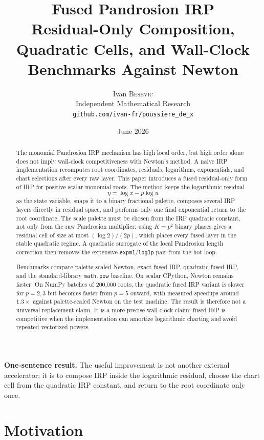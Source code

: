 \documentclass[10pt,a4paper]{article}
\title{\bfseries Fused Pandrosion IRP\\[-0.1em]
\large Residual-Only Composition, Quadratic Cells, and Wall-Clock Benchmarks Against Newton}
\author{Ivan \textsc{Besevic}\\[-0.2em]
\small Independent Mathematical Research\\[-0.2em]
\small \texttt{github.com/ivan-fr/poussiere\_de\_x}}
\date{June 2026}
\theoremstyle{plain}
\theoremstyle{definition}
\newenvironment{takeaway}{%
  \begin{center}\begin{minipage}{0.92\linewidth}\small\itshape\color{blue!45!black}%
}{%
  \end{minipage}\end{center}%
}
\begin{document}
\maketitle

\begin{abstract}
The monomial Pandrosion IRP mechanism has high local order, but high order alone
does not imply wall-clock competitiveness with Newton's method.  A naive IRP
implementation recomputes root coordinates, residuals, logarithms, exponentials,
and chart selections after every raw layer.  This paper introduces a fused
residual-only form of IRP for positive scalar monomial roots.  The method keeps
the logarithmic residual
\[
  \eta=\log x-p\log u
\]
as the state variable, snaps it to a binary fractional palette, composes several
IRP layers directly in residual space, and performs only one final exponential
return to the root coordinate.  The scale palette must be chosen from the IRP
quadratic constant, not only from the raw Pandrosion multiplier: using
$K=p^2$ binary phases gives a residual cell of size at most $(\log 2)/(2p)$,
which places every fused layer in the stable quadratic regime.  A quadratic
surrogate of the local Pandrosion length correction then removes the expensive
\texttt{expm1}/\texttt{log1p} pair from the hot loop.

Benchmarks compare palette-scaled Newton, exact fused IRP, quadratic fused IRP,
and the standard-library \texttt{math.pow} baseline.  On scalar CPython,
Newton remains faster.  On NumPy batches of 200,000 roots, the quadratic fused
IRP variant is slower for $p=2,3$ but becomes faster from $p=5$ onward, with
measured speedups around $1.3\times$ against palette-scaled Newton on the test
machine.  The result is therefore not a universal replacement claim.  It is a
more precise wall-clock claim: fused IRP is competitive when the implementation
can amortize logarithmic charting and avoid repeated vectorized powers.
\end{abstract}

\begin{takeaway}
\textbf{One-sentence result.}
The useful improvement is not another external accelerator; it is to compose IRP
inside the logarithmic residual, choose the chart cell from the quadratic IRP
constant, and return to the root coordinate only once.
\end{takeaway}

\section{Motivation}
\end{document}
